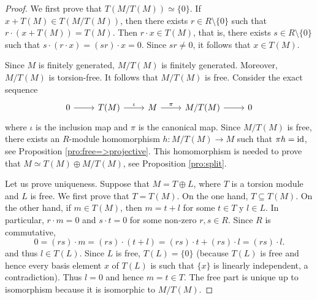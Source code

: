 \begin{proof}
	We first prove that $T(M/T(M))\simeq\{0\}$. If 
	$x+T(M)\in T(M/T(M))$, then there exists $r\in R\setminus\{0\}$ such that 
	$r\cdot (x+T(M))=T(M)$. Then $r\cdot x\in T(M)$, that is, there exists 
	$s\in R\setminus\{0\}$ such that $s\cdot (r\cdot x)=(sr)\cdot x=0$. 
	Since $sr\ne 0$, it follows that $x\in T(M)$. 

	Since $M$ is finitely generated, $M/T(M)$ is finitely generated. Moreover, $M/T(M)$ is torsion-free. 
	It follows that $M/T(M)$ is free. Consider the exact sequence 
	\[
		\begin{tikzcd}
			0 & T(M) & M & M/T(M) & 0
			\arrow[from=1-1, to=1-2]
			\arrow["\iota", from=1-2, to=1-3]
			\arrow["\pi", from=1-3, to=1-4]
			\arrow[from=1-4, to=1-5]
	\end{tikzcd}\]
	where $\iota$ is the inclusion map and $\pi$ is the canonical map.  Since
	$M/T(M)$ is free, there exists an $R$-module homomorphism $h\colon M/T(M)\to M$
	such that $\pi h=\operatorname{id}$, see Proposition \ref{pro:free=>projective}. This homomorphism
	is needed to prove that $M\simeq
	T(M)\oplus M/T(M)$, see Proposition \ref{pro:split}. 
	 
	Let us prove uniqueness. Suppose that $M=T\oplus L$, where 
	$T$ is a torsion module and $L$ is free. We first prove that
	$T=T(M)$. On the one hand,  
	$T\subseteq T(M)$. On the other hand, if $m\in T(M)$, then
	$m=t+l$ for some $t\in T$ y $l\in L$. In particular, 
	$r\cdot m=0$ and $s\cdot t=0$ for some non-zero $r,s\in R$. Since $R$ is commutative, 
	\[
		0=(rs)\cdot m=(rs)\cdot (t+l)=(rs)\cdot t+(rs)\cdot l=(rs)\cdot l.
	\]
	and thus $l\in T(L)$. Since  
	$L$ is free, $T(L)=\{0\}$ (because $T(L)$ is free and hence every basis element $x$ of  
	$T(L)$ is such that $\{x\}$ is linearly independent, a contradiction). Thus 
	$l=0$ and hence  $m=t\in T$. The free part is unique up to isomorphism 
	because it is isomorphic to $M/T(M)$. 
\end{proof}


